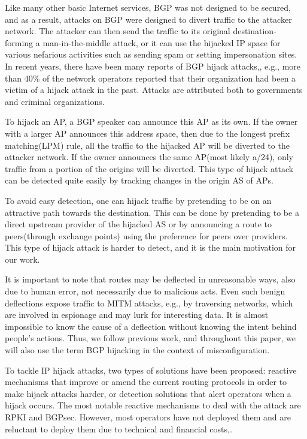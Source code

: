 \documentclass[10pt,journal]{IEEEtran}
\begin{document}
Like many other basic Internet services, BGP was not designed to be secured, and as a result, attacks on BGP were designed to divert traffic to the attacker network. The attacker can then send the traffic to its original destination- forming a man-in-the-middle attack, or it can use the hijacked IP space for various nefarious activities such as sending spam or setting impersonation sites. In recent years, there have been many reports of BGP hijack attacks\cite{sermezis2018survey},\cite{demchak2018china}, e.g., more than 40\% of the network operators reported that their organization had been a victim of a hijack attack in the past\cite{sermezis2018survey}. Attacks are attributed both to governments and criminal organizations.

To hijack an AP, a BGP speaker can announce this AP as its own. If the owner with a larger AP announces this address space, then due to the longest prefix matching(LPM) rule, all the traffic to the hijacked AP will be diverted to the attacker network. If the owner announces the same AP(most likely a/24), only traffic from a portion of the origins will be diverted. This type of hijack attack can be detected quite easily by tracking changes in the origin AS of APs\cite{gilad2018perfect}.

To avoid easy detection, one can hijack traffic by pretending to be on an attractive path towards the destination. This can be done by pretending to be a direct upstream provider of the hijacked AS or by announcing a route to peers(through exchange points) using the preference for peers over providers. This type of hijack attack is harder to detect, and it is the main motivation for our work.

It is important to note that routes may be deflected in unreasonable ways, also due to human error, not necessarily due to malicious acts. Even such benign deflections expose traffic to MITM attacks, e.g., by traversing networks, which are involved in espionage and may lurk for interesting data. It is almost impossible to know the cause of a deflection without knowing the intent behind people's actions. Thus, we follow previous work\cite{cho2019bgp}, and throughout this paper, we will also use the term BGP hijacking in the context of misconfiguration.

To tackle IP hijack attacks, two types of solutions have been proposed: reactive mechanisms that improve or amend the current routing protocols in order to make hijack attacks harder, or detection solutions that alert operators when a hijack occurs. The most notable reactive mechanisms to deal with the attack are RPKI\cite{huston2011securing} and BGPsec\cite{lepinski2017bgpsec}. However, most operators have not deployed them and are reluctant to deploy them due to technical and financial costs\cite{gilad2017there},\cite{chung2019rpki}.
\end{document}
